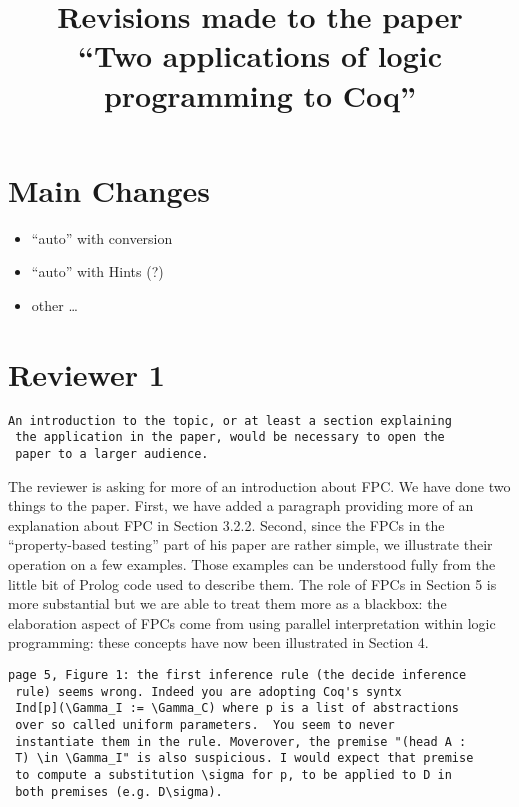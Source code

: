 \documentclass{article}
\begin{document}
\title{Revisions made to the paper \\
  ``Two applications of logic programming to Coq''}
\maketitle{}

\section*{Main Changes}

\begin{itemize}
\item ``auto'' with conversion
\item ``auto'' with Hints (?)
\item other \dots
\end{itemize}

\section*{Reviewer 1}
\begin{verbatim}
An introduction to the topic, or at least a section explaining
 the application in the paper, would be necessary to open the
 paper to a larger audience.
\end{verbatim}

The reviewer is asking for more of an introduction about FPC.  We
have done two things to the paper.  First, we have added a
paragraph providing more of an explanation about FPC in Section
3.2.2.  Second, since the FPCs in the ``property-based testing''
part of his paper are rather simple, we illustrate their
operation on a few examples.  Those examples can be understood
fully from the little bit of Prolog code used to describe them.
The role of FPCs in Section 5 is more substantial but we are able
to treat them more as a blackbox: the elaboration aspect of FPCs
come from using parallel interpretation within logic programming:
these concepts have now been illustrated in Section 4.

\begin{verbatim}
page 5, Figure 1: the first inference rule (the decide inference
 rule) seems wrong. Indeed you are adopting Coq's syntx
 Ind[p](\Gamma_I := \Gamma_C) where p is a list of abstractions
 over so called uniform parameters.  You seem to never
 instantiate them in the rule. Moverover, the premise "(head A :
 T) \in \Gamma_I" is also suspicious. I would expect that premise
 to compute a substitution \sigma for p, to be applied to D in
 both premises (e.g. D\sigma).
\end{verbatim}
\end{document}
